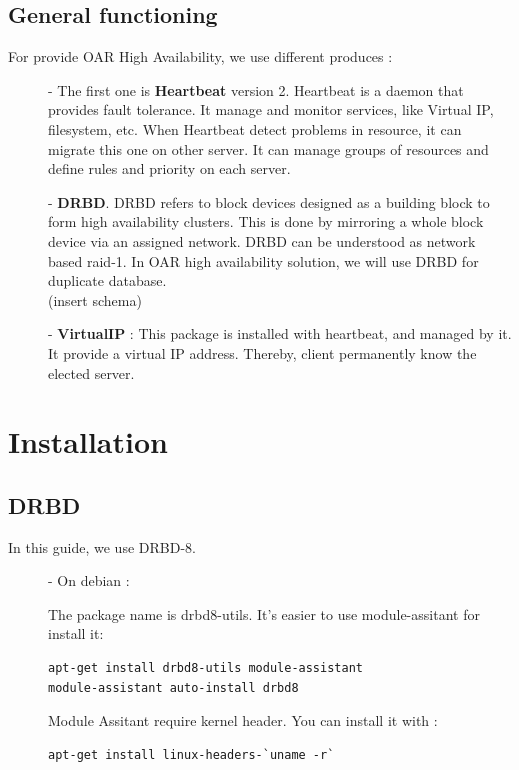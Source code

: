 \documentclass[a4paper,10pt]{report}
\begin{document}
\section{General functioning}
For provide OAR High Availability, we use different produces :
\begin{description}
\item[]- The first one is \textbf{Heartbeat} version 2. Heartbeat is a daemon that provides fault tolerance. It manage and monitor services, like Virtual IP, filesystem, etc. When Heartbeat detect problems in resource, it can migrate this one on other server. It can manage groups of resources and define rules and priority on each server.
\item[]- \textbf{DRBD}. DRBD refers to block devices designed as a building block to form high availability clusters. This is done by mirroring a whole block device via an assigned network. DRBD can be understood as network based raid-1. In OAR high availability solution, we will use DRBD for duplicate database.\\
(insert schema)
\item[]- \textbf{VirtualIP} : This package is installed with heartbeat, and managed by it. It provide a virtual IP address. Thereby, client permanently know the elected server.

\end{description}













\chapter{Installation}
\section{DRBD}
In this guide, we use DRBD-8.
\begin{description}
\item[]- On debian :

The package name is drbd8-utils. It's easier to use module-assitant for install it:
\begin{lstlisting}
apt-get install drbd8-utils module-assistant
module-assistant auto-install drbd8
\end{lstlisting} 



Module Assitant require kernel header. You can install it with :
\begin{lstlisting}
apt-get install linux-headers-`uname -r`
\end{lstlisting}

\end{description}
\end{document}
